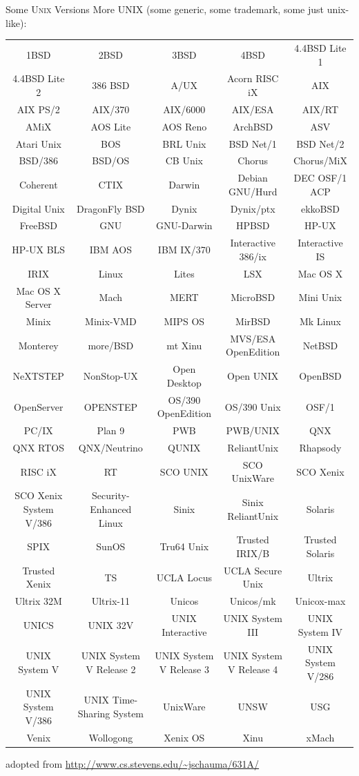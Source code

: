 \documentclass[newPxFont,sthlmFooter,nooffset]{beamer}
\begin{document}
\begin{frame}[t]{Some \textsc{Unix} Versions}
More UNIX (some generic, some trademark, some just unix-like):
\\
{
\fontsize{5pt}{6pt}\selectfont
\begin{tabular}{ c c c c c}
	1BSD & 2BSD & 3BSD & 4BSD & 4.4BSD Lite 1 \\
	4.4BSD Lite 2 & 386 BSD & A/UX & Acorn RISC iX & AIX \\
	AIX PS/2 & AIX/370 & AIX/6000 & AIX/ESA & AIX/RT \\
	AMiX & AOS Lite & AOS Reno & ArchBSD & ASV \\
	Atari Unix & BOS & BRL Unix & BSD Net/1 & BSD Net/2 \\
	BSD/386 & BSD/OS & CB Unix & Chorus & Chorus/MiX \\
	Coherent & CTIX & Darwin & Debian GNU/Hurd & DEC OSF/1 ACP \\
	Digital Unix & DragonFly BSD & Dynix & Dynix/ptx & ekkoBSD \\
	FreeBSD & GNU & GNU-Darwin & HPBSD & HP-UX \\
	HP-UX BLS & IBM AOS & IBM IX/370 & Interactive 386/ix & Interactive IS \\
	IRIX & Linux & Lites & LSX & Mac OS X \\
	Mac OS X Server & Mach & MERT & MicroBSD & Mini Unix \\
	Minix & Minix-VMD & MIPS OS & MirBSD & Mk Linux \\
	Monterey & more/BSD & mt Xinu & MVS/ESA OpenEdition & NetBSD \\
	NeXTSTEP & NonStop-UX & Open Desktop & Open UNIX & OpenBSD \\
	OpenServer & OPENSTEP & OS/390 OpenEdition & OS/390 Unix & OSF/1 \\
	PC/IX & Plan 9 & PWB & PWB/UNIX & QNX \\
	QNX RTOS & QNX/Neutrino & QUNIX & ReliantUnix & Rhapsody \\
	RISC iX & RT & SCO UNIX & SCO UnixWare & SCO Xenix \\
	SCO Xenix System V/386 & Security-Enhanced Linux & Sinix &
		Sinix ReliantUnix & Solaris \\
	SPIX & SunOS & Tru64 Unix & Trusted IRIX/B & Trusted Solaris \\
	Trusted Xenix & TS & UCLA Locus & UCLA Secure Unix & Ultrix \\
	Ultrix 32M & Ultrix-11 & Unicos & Unicos/mk & Unicox-max \\
	UNICS & UNIX 32V & UNIX Interactive & UNIX System III & UNIX System IV \\
	UNIX System V & UNIX System V Release 2 & UNIX System V Release 3 &
		UNIX System V Release 4 & UNIX System V/286 \\
	UNIX System V/386 & UNIX Time-Sharing System & UnixWare & UNSW & USG \\
	Venix & Wollogong & Xenix OS & Xinu & xMach \\
\end{tabular}
}
\bigskip

\hfill {\footnotesize adopted from \url{http://www.cs.stevens.edu/~jschauma/631A/}}
\end{frame}
\end{document}
